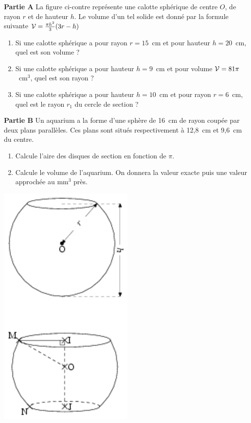 

\begin{minipage}{0.68\linewidth}
\textbf{Partie A} La figure ci-contre
représente une calotte sphérique de centre $O$, de rayon $r$ et de
hauteur $h$. Le volume d'un tel solide est donné par la formule
suivante
${\cal V}=\frac{\pi h^2}{3}(3r-h)$
\begin{enumerate}
\item Si une calotte sphérique a pour rayon $r=15$~cm et pour hauteur
$h=20$~cm, quel est son volume ?
\item Si une calotte sphérique a pour hauteur $h=9$~cm et pour volume
${\cal V}=81\pi$~cm$^3$, quel est son rayon ?
\item Si une calotte sphérique a pour hauteur $h=10$~cm et pour rayon
$r=6$~cm, quel est le rayon $r_1$ du cercle de section ?
\end{enumerate}

\textbf{Partie B} Un aquarium a la forme
d'une sphère de 16~cm de rayon coupée par deux plans
parallèles. Ces plans sont situés respectivement à 12,8~cm et
9,6~cm du centre.
\begin{enumerate}
\item Calcule l'aire des disques de section en fonction de $\pi$.
\item Calcule le volume de l'aquarium. On donnera la valeur exacte
puis une valeur approchée au mm$^3$ près.
\end{enumerate}
\end{minipage}
\hfill
\begin{minipage}{0.28\linewidth}
\includegraphics[scale=1]{RepS-43.eps} 
\end{minipage}

